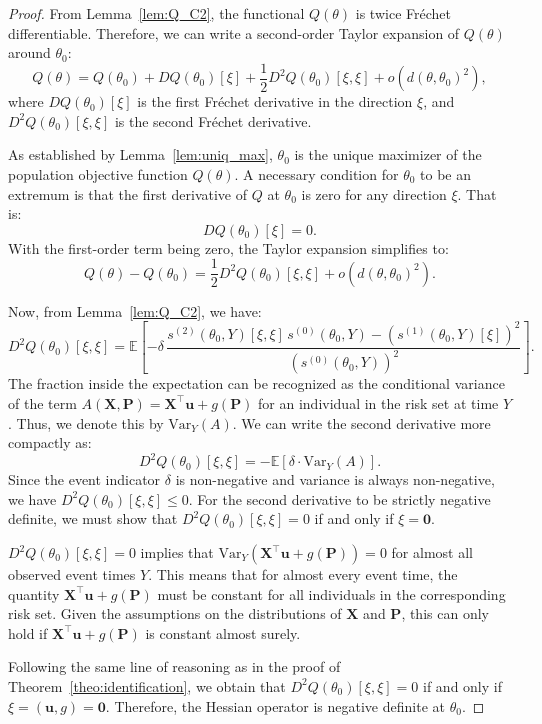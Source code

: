 \documentclass[11pt]{article}
\newcommand{\E}{\mathbb{E}}
\begin{document}
\begin{proof}
		From Lemma~\ref{lem:Q_C2}, the functional $Q(\theta)$ is twice Fréchet differentiable. Therefore, we can write a second-order Taylor expansion of $Q(\theta)$ around $\theta_0$:
		$$
		Q(\theta) = Q(\theta_0) + DQ(\theta_0)[\xi] + \frac{1}{2} D^2Q(\theta_0)[\xi, \xi] + o(d(\theta, \theta_0)^2),
		$$
		where $DQ(\theta_0)[\xi]$ is the first Fréchet derivative in the direction $\xi$, and $D^2Q(\theta_0)[\xi, \xi]$ is the second Fréchet derivative.
		
		As established by Lemma~\ref{lem:uniq_max}, $\theta_0$ is the unique maximizer of the population objective function $Q(\theta)$. A necessary condition for $\theta_0$ to be an extremum is that the first derivative of $Q$ at $\theta_0$ is zero for any direction $\xi$. That is:
		$$
		DQ(\theta_0)[\xi] = 0.
		$$
        With the first-order term being zero, the Taylor expansion simplifies to:
		$$
		Q(\theta) - Q(\theta_0) = \frac{1}{2} D^2Q(\theta_0)[\xi, \xi] + o(d(\theta, \theta_0)^2).
		$$
		
		
		Now, from Lemma~\ref{lem:Q_C2}, we have:
		$$
		D^2Q(\theta_0)[\xi, \xi] = \E\left[ -\delta\, \frac{ s^{(2)}(\theta_0,Y)[\xi,\xi]\,s^{(0)}(\theta_0,Y) - \left(s^{(1)}(\theta_0,Y)[\xi]\right)^2 }{ \left(s^{(0)}(\theta_0,Y)\right)^2 } \right].
		$$
		The fraction inside the expectation can be recognized as the conditional variance of the term $A(\bm X, \bm P) = \bm X^\top \bm u + g(\bm P)$ for an individual in the risk set at time $Y$. Thus, we denote this by $\text{Var}_Y(A)$. We can write the second derivative more compactly as:
		\begin{equation}\label{eq:cocave}
		D^2Q(\theta_0)[\xi, \xi] = -\E[\delta \cdot \text{Var}_Y(A)].
		\end{equation}
		Since the event indicator $\delta$ is non-negative and variance is always non-negative, we have $D^2Q(\theta_0)[\xi, \xi] \le 0$. For the second derivative to be strictly negative definite, we must show that $D^2Q(\theta_0)[\xi, \xi] = 0$ if and only if $\xi = \bm 0$.
		
		$D^2Q(\theta_0)[\xi, \xi] = 0$ implies that $\text{Var}_Y(\bm X^\top \bm u + g(\bm P)) = 0$ for almost all observed event times $Y$. This means that for almost every event time, the quantity $\bm X^\top \bm u + g(\bm P)$ must be constant for all individuals in the corresponding risk set. 
		Given the assumptions on the distributions of $\bm X$ and $\bm P$, this can only hold if $\bm X^\top \bm u + g(\bm P)$ is constant almost surely.
		
		Following the same line of reasoning as in the proof of Theorem~\ref{theo:identification}, we obtain that $D^2Q(\theta_0)[\xi, \xi] = 0$ if and only if $\xi = (\bm u, g) = \bm 0$. Therefore, the Hessian operator is negative definite at $\theta_0$.
		

\end{proof}
\end{document}
